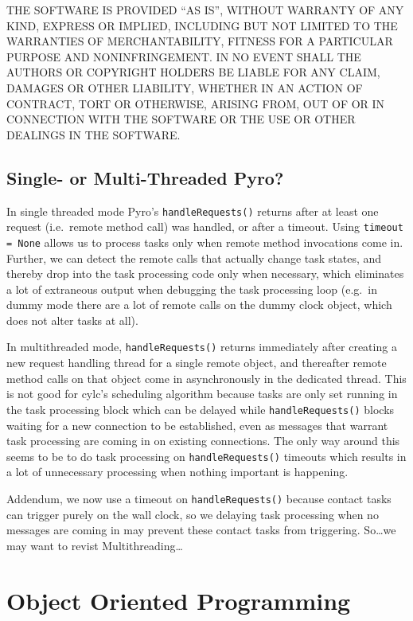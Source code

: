 \documentclass[11pt,a4paper]{article}
\begin{document}
THE SOFTWARE IS PROVIDED ``AS IS'', WITHOUT WARRANTY OF ANY KIND,
EXPRESS OR IMPLIED, INCLUDING BUT NOT LIMITED TO THE WARRANTIES OF
MERCHANTABILITY, FITNESS FOR A PARTICULAR PURPOSE AND NONINFRINGEMENT.
IN NO EVENT SHALL THE AUTHORS OR COPYRIGHT HOLDERS BE LIABLE FOR ANY
CLAIM, DAMAGES OR OTHER LIABILITY, WHETHER IN AN ACTION OF CONTRACT,
TORT OR OTHERWISE, ARISING FROM, OUT OF OR IN CONNECTION WITH THE
SOFTWARE OR THE USE OR OTHER DEALINGS IN THE SOFTWARE.
                                          
\subsection{Single- or Multi-Threaded Pyro?}
\label{Single-orMulti-ThreadedPyro?}

In single threaded mode Pyro's \lstinline=handleRequests()= returns
after at least one request (i.e.\ remote method call) was
handled, or after a timeout. Using \lstinline|timeout = None| 
allows us to process tasks only when remote method invocations
come in.  Further, we can detect the remote calls that actually change
task states, and thereby drop into the task processing code only when
necessary, which eliminates a lot of extraneous output when debugging
the task processing loop (e.g.\ in dummy mode there are a lot of remote
calls on the dummy clock object, which does not alter tasks at all). 

In multithreaded mode, \lstinline=handleRequests()= returns immediately
after creating a new request handling thread for a single remote object,
and thereafter remote method calls on that object come in asynchronously
in the dedicated thread. This is not good for cylc's scheduling
algorithm because tasks are only set running in the task processing
block which can be delayed while \lstinline=handleRequests()= blocks waiting
for a new connection to be established, even as messages that warrant
task processing are coming in on existing connections. The only way
around this seems to be to do task processing on \lstinline=handleRequests()=
timeouts which results in a lot of unnecessary processing when nothing
important is happening.

Addendum, we now use a timeout on \lstinline=handleRequests()= because
contact tasks can trigger purely on the wall clock, so we delaying task
processing when no messages are coming in may prevent these contact
tasks from triggering.   So\dots we may want to revist Multithreading\dots


\section{Object Oriented Programming}
\label{ObjectOrientedProgramming}
\end{document}
